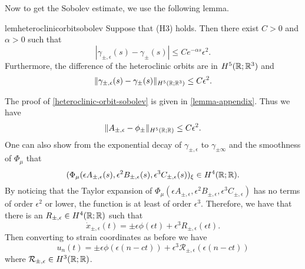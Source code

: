 Now to get the Sobolev estimate, we use the following lemma.
\begin{restatable}{lem}{heteroclinicorbitsobolev}\label{heteroclinic-orbit-sobolev}
	Suppose that (H3) holds. Then there exist \(C> 0\) and \(\alpha > 0\) such that
	\begin{equation}
		| \gamma_{\pm, \epsilon}(s) - \gamma_{\pm}(s) | \leq C e^{-\alpha s} \epsilon^2.
	\end{equation}
	Furthermore, the difference of the heteroclinic orbits are in \(H^5(\mathbb{R}; \mathbb{R}^3)\) and 
	\begin{equation}
		\| \gamma_{\pm, \epsilon}(s) - \gamma_{\pm}(s) \|_{H^5(\mathbb{R};\mathbb{R}^3)}  \leq C \epsilon^2.
	\end{equation}
\end{restatable}
The proof of \cref{heteroclinic-orbit-sobolev} is given in \cref{lemma-appendix}. Thus we have
\begin{equation}
	\|A_{\pm, \epsilon} - \phi_{\pm}\|_{H^5(\mathbb{R};\mathbb{R})} \leq C \epsilon^2.
\end{equation}
One can also show from the exponential decay of \(\gamma_{\pm, \epsilon}\) to \(\gamma_{\pm\infty}\) and the smoothness of \(\Phi_\mu\) that
\begin{equation}
	(\Phi_\mu(\epsilon A_{\pm, \epsilon}(s),\epsilon^2 B_{\pm, \epsilon}(s) ,\epsilon^3 C_{\pm, \epsilon}(s))_\xi \in H^4(\mathbb{R};\mathbb{R}).
\end{equation}
By noticing that the Taylor expansion of \(\Phi_\mu(\epsilon A_{\pm, \epsilon}, \epsilon^2 B_{\pm, \epsilon}, \epsilon^3 C_{\pm, \epsilon})\) has no terms of order \(\epsilon^2\) or lower, the function is at least of order \(\epsilon^3\). Therefore, we have that there is an \(R_{\pm,\epsilon} \in H^4(\mathbb{R};\mathbb{R})\) such that
\begin{equation}
	\dot x_{\pm, \epsilon }(t) = \pm \epsilon\phi(\epsilon t) + \epsilon^3 R_{\pm,\epsilon}(\epsilon t).
\end{equation}
Then converting to strain coordinates as before we have
\begin{equation}
	u_n(t) = \pm\epsilon\phi(\epsilon(n-ct)) + \epsilon^3 \mathcal R_{\pm, \epsilon}(\epsilon(n-ct))
\end{equation}
where \(\mathcal R_{\pm, \epsilon} \in H^3(\mathbb{R};\mathbb{R})\).

